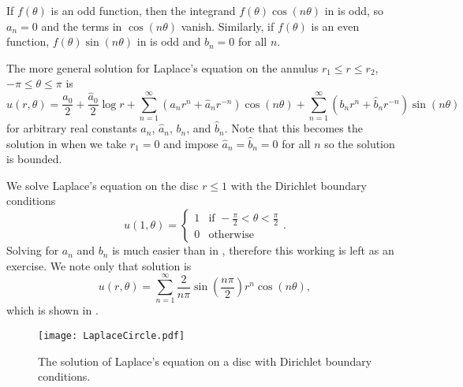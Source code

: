 \begin{enumerate}
	\begin{remark}
		If $f(\theta)$ is an odd function, then the integrand $f(\theta) \cos(n\theta)$ in  is odd, so $a_n=0$ and the terms in $\cos(n\theta)$ vanish. Similarly, if $f(\theta)$ is an even function, $f(\theta) \sin(n\theta)$ in  is odd and $b_n=0$ for all $n$.
	\end{remark}
	
	\begin{remark}
		The more general solution for Laplace's equation on the annulus $r_1 \leq r \leq r_2$, $-\pi \leq \theta \leq \pi$ is
		\begin{equation}
			u(r,\theta) = \frac{a_0}{2} + \frac{\hat{a}_0}{2}\log{r} + \sum_{n=1}^{\infty} \left(a_nr^n + \hat{a}_nr^{-n}\right)\cos(n\theta) + \sum_{n=1}^{\infty} \left(b_nr^n + \hat{b}_nr^{-n}\right)\sin(n\theta)
		\end{equation}
		for arbitrary real constants $a_n$, $\hat{a}_n$, $b_n$, and $\hat{b}_n$. Note that this becomes the solution in  when we take $r_1=0$ and impose $\hat{a}_n = \hat{b}_n = 0$ for all $n$ so the solution is bounded.
	\end{remark}
	
	\begin{eg}
		We solve Laplace's equation on the disc $r \leq 1$ with the Dirichlet boundary conditions
		\[
		u(1, \theta) = \begin{cases} 1 & \text{if } -\frac{\pi}{2} < \theta < \frac{\pi}{2} \\ 0 & \text{otherwise} \end{cases}.
		\]
		Solving for $a_n$ and $b_n$ is much easier than in , therefore this working is left as an exercise. We note only that solution is 
		\[
		u(r,\theta) = \sum_{n=1}^{\infty} \frac{2}{n\pi}\sin\left(\frac{n\pi}{2}\right) r^n \cos(n\theta),
		\] 
		which is shown in .
	\end{eg}
	
	\begin{figure}[!ht]
		\centering
		\texttt{[image: LaplaceCircle.pdf]}
		\caption{The solution of Laplace's equation on a disc with Dirichlet boundary conditions.}
		\label{fig:laplacecircle}
	\end{figure}
\end{enumerate}